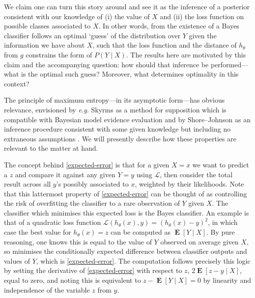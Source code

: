 \documentclass[11pt]{amsart}
\numberwithin{equation}{section}
\theoremstyle{remark}
\theoremstyle{remark}
\DeclareMathOperator{\E}{\mathbf{E}}
\newcommand{\lag}{\mathcal{L}}
\begin{document}
We claim one can turn this story around and see it as the inference of a posterior consistent with our knowledge of (i) the value of $X$ and (ii) the loss function on possible classes associated to $X$. In other words, from the existence of a Bayes classifier follows an optimal `guess' of the distribution over $Y$ given the information we have about $X$, such that the loss function and the distance of $h_\theta$ from $g$ constrains the form of $P(Y \mid X)$. The results here are motivated by this claim and the accompanying question: how should that inference be performed---what is the optimal such guess? Moreover, what determines optimality in this context?

The principle of maximum entropy---in its asymptotic form---has obvious relevance, envisioned by {\it e.g.} Skyrms as a method for supposition which is compatible with Bayesian model evidence evaluation \cite{skyrms1987updating} and by Shore--Johnson as an inference procedure consistent with some given knowledge but including no extraneous assumptions \cite{shore1980axiomatic}. We will presently describe how these properties are relevant to the matter at hand.

The concept behind \eqref{expected-error} is that for a given $X=x$ we want to predict a $z$ and compare it against any given $Y=y$ using $\lag$, then consider the total result across all $y$'s possibly associated to $x$, weighted by their likelihoods. Note that this lattermost property of \eqref{expected-error} can be thought of as controlling the risk of overfitting the classifier to a rare observation of $Y$ given $X$. The classifier which minimises this expected loss is the Bayes classifier. An example is that of a quadratic loss function $\lag(h_\theta(x), y) = (h_\theta(x) - y)^2$, in which case the best value for $h_\theta(x) = z$ can be computed as $\E[Y \mid X]$. By pure reasoning, one knows this is equal to the value of $Y$ observed on average given $X$, so minimises the conditionally expected difference between classifier outputs and values of $Y$, which is \eqref{expected-error}. The computation follows precisely this logic by setting the derivative of \eqref{expected-error} with respect to $z$, $2\E[z - y \mid X]$, equal to zero, and noting this is equivalent to $z - \E[Y \mid X] = 0$ by linearity and independence of the variable $z$ from $y$.
\end{document}
